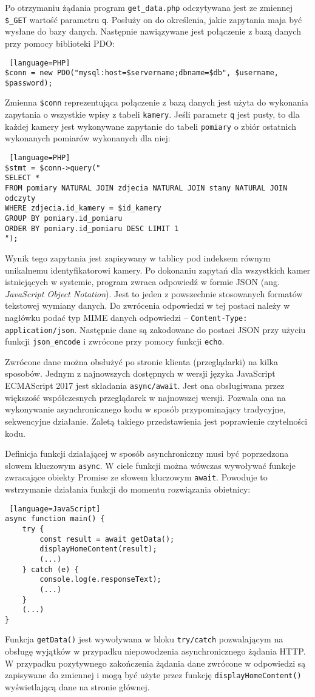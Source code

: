 \documentclass[a4paper,11pt,twoside]{article}
\begin{document}
Po otrzymaniu żądania program \texttt{get{\_}data.php} odczytywana jest ze zmiennej \texttt{{\$\_}GET} wartość parametru \texttt{q}. Posłuży on do określenia, jakie zapytania maja być wysłane do bazy danych. Następnie nawiązywane jest połączenie z bazą danych przy pomocy biblioteki PDO:
\begin{lstlisting} [language=PHP]
$conn = new PDO("mysql:host=$servername;dbname=$db", $username, $password);
\end{lstlisting}
Zmienna \texttt{\$conn} reprezentująca połączenie z bazą danych jest użyta do wykonania zapytania o wszystkie wpisy z tabeli \texttt{kamery}. Jeśli parametr \texttt{q} jest pusty, to dla każdej kamery jest wykonywane zapytanie do tabeli \texttt{pomiary} o zbiór ostatnich wykonanych pomiarów wykonanych dla niej:
\begin{lstlisting} [language=PHP]
$stmt = $conn->query("
SELECT *
FROM pomiary NATURAL JOIN zdjecia NATURAL JOIN stany NATURAL JOIN odczyty
WHERE zdjecia.id_kamery = $id_kamery 
GROUP BY pomiary.id_pomiaru 
ORDER BY pomiary.id_pomiaru DESC LIMIT 1
");
\end{lstlisting}
Wynik tego zapytania jest zapisywany w tablicy pod indeksem równym unikalnemu identyfikatorowi kamery. Po dokonaniu zapytań dla wszystkich kamer istniejących w systemie, program zwraca odpowiedź w formie JSON (ang. \textit{JavaScript Object Notation}). Jest to jeden z powszechnie stosowanych formatów tekstowej wymiany danych. Do zwrócenia odpowiedzi w tej postaci należy w nagłówku podać typ MIME danych odpowiedzi\cite{mime2} -- \texttt{Content-Type: application/json}. Następnie dane są zakodowane do postaci JSON przy użyciu funkcji \texttt{json{\_}encode} i zwrócone przy pomocy funkcji \texttt{echo}.

Zwrócone dane można obsłużyć po stronie klienta (przeglądarki) na kilka sposobów. Jednym z najnowszych dostępnych w wersji języka JavaScript ECMAScript 2017 jest składania \texttt{async/await}. Jest ona obsługiwana przez większość współczesnych przeglądarek w najnowszej wersji.\cite{async} Pozwala ona na wykonywanie asynchronicznego kodu w sposób przypominający tradycyjne, sekwencyjne działanie. Zaletą takiego przedstawienia jest poprawienie czytelności kodu. 

Definicja funkcji działającej w sposób asynchroniczny musi być poprzedzona słowem kluczowym \texttt{async}. W ciele funkcji można wówczas wywoływać funkcje zwracające obiekty Promise ze słowem kluczowym \texttt{await}. Powoduje to wstrzymanie działania funkcji do momentu rozwiązania obietnicy:
\begin{lstlisting} [language=JavaScript]
async function main() {
    try {
        const result = await getData();
        displayHomeContent(result);
        (...)
    } catch (e) {
        console.log(e.responseText);
        (...)
    }
	(...)
}
\end{lstlisting}
Funkcja \texttt{getData()} jest wywoływana w bloku \texttt{try/catch} pozwalającym na obsługę wyjątków w przypadku niepowodzenia asynchronicznego żądania HTTP. W przypadku pozytywnego zakończenia żądania dane zwrócone w odpowiedzi są zapisywane do zmiennej i mogą być użyte przez funkcję \texttt{displayHomeContent()} wyświetlającą dane na stronie głównej.
\end{document}

